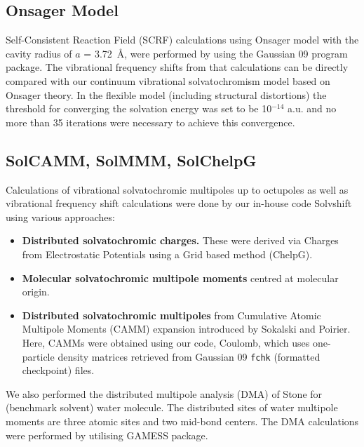 \documentclass[b5paper,oneside,fleqn,11pt]{book}
\begin{document}
\begin{appendices}
\begin{refsection}
\subsection{Onsager Model}

Self\hyp{}Consistent Reaction Field (SCRF) calculations
using Onsager model \citep{Kirkwood.JCP.1934,Onsager.JACS.1936,
Wong.Frisch.Wiberg.JACS.1991,Wong.Wiberg.Frisch.JCP.1991,
Wong.Wiberg.Frisch.JACS.1992}
%
with the cavity radius of
$a$ = 3.72~\AA, were performed by using the {\sc Gaussian 09} program package. \citep{Frisch.Gaussian.2009}
The vibrational frequency shifts from that calculations can be directly
compared with our continuum vibrational solvatochromism model
based on Onsager theory. In the flexible model (including structural
distortions) the threshold for converging the solvation energy
was set to be 10$^{-14}$ a.u. and no more than 35 iterations were necessary
to achieve this convergence.


\subsection{SolCAMM, SolMMM, SolChelpG}

Calculations
of vibrational solvatochromic multipoles up to octupoles as
well as vibrational frequency shift calculations were done by
our in\hyp{}house code {\sc Solvshift} using various approaches:
%
\begin{itemize}
\item {\bf Distributed solvatochromic charges.} These were derived
via Charges from Electrostatic Potentials using a Grid
based method (ChelpG). \citep{Breneman.Wiberg.JCC.1990}
\item {\bf Molecular solvatochromic multipole moments}
centred at molecular origin. \citep{Lee.Choi.Cho.JCP.2012}
\item {\bf Distributed solvatochromic multipoles} from Cumulative
Atomic Multipole Moments (CAMM) expansion introduced
by Sokalski and Poirier. \citep{Sokalski.Poirier.CPL.1983}
Here, CAMMs were obtained using our code,
{\sc Coulomb}, which uses one\hyp{}particle density matri\-ces retrieved
from {\sc Gaussian 09} \verb+fchk+ (formatted checkpoint)
files. 
\end{itemize}
%
We also performed the
distributed multipole analysis (DMA) of Stone \citep{Sokalski.Poirier.CPL.1983} 
for (benchmark
solvent) water molecule. The distributed sites of water
multipole moments are three atomic sites and two mid\hyp{}bond
centers. The DMA calculations were performed by utilising
GAMESS package. \citep{GAMESS.JCC.1993}


\end{refsection}
\end{appendices}
\end{document}
